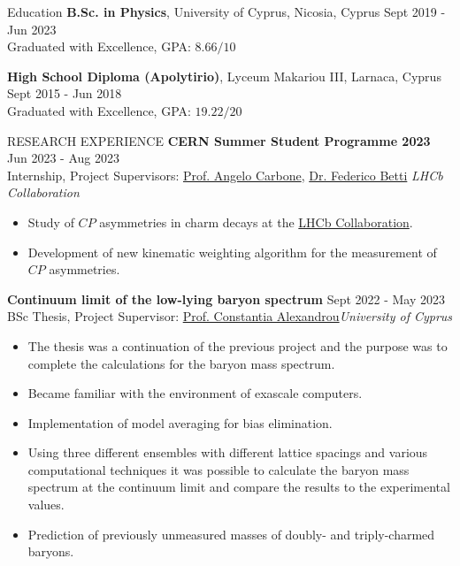 \documentclass{resume} %
\begin{document}
\begin{rSection}{Education}
{\bf B.Sc. in Physics}, University of Cyprus, Nicosia, Cyprus \hfill {Sept 2019 - Jun 2023}\\
Graduated with Excellence, GPA: $8.66/10$

{\bf High School Diploma (Apolytirio)}, Lyceum Makariou III, Larnaca, Cyprus \hfill {Sept 2015 - Jun 2018}\\
Graduated with Excellence, GPA: $19.22/20$
\end{rSection}

\bigbreak

\begin{rSection}{RESEARCH EXPERIENCE}
\textbf{CERN Summer Student Programme 2023} \hfill Jun 2023 - Aug 2023\\
Internship, Project Supervisors: \href{https://www.unibo.it/sitoweb/angelo.carbone/en}{Prof. Angelo Carbone}, \href{https://www.ph.ed.ac.uk/people/federico-betti}{Dr. Federico Betti}
\hfill \textit{LHCb Collaboration}
\begin{itemize}
\itemsep -3pt {}
\item Study of $CP$ asymmetries in charm decays at the \href{https://lhcb.web.cern.ch/}{LHCb Collaboration}.
\item Development of new kinematic weighting algorithm for the measurement of $CP$ asymmetries.
\end{itemize}

\textbf{Continuum limit of the low-lying baryon spectrum} \hfill Sept 2022 - May 2023\\
BSc Thesis, Project Supervisor:  \href{https://www.cyi.ac.cy/index.php/castorc/about-the-center/castorc-our-people/itemlist/user/99-constantia-alexandrou.html}{Prof. Constantia Alexandrou}\hfill \textit{University of Cyprus}
\begin{itemize}
\itemsep -3pt {} 
\item The thesis was a continuation of the previous project and the purpose was to complete the calculations for the baryon mass spectrum.
\item Became familiar with the environment of exascale computers.
\item Implementation of model averaging for bias elimination.
\item Using three different ensembles with different lattice spacings and various computational techniques it was possible to calculate the baryon mass spectrum at the continuum limit and compare the results to the experimental values.
\item Prediction of previously unmeasured masses of doubly- and triply-charmed baryons.
\end{itemize}


\end{rSection}
\end{document}
